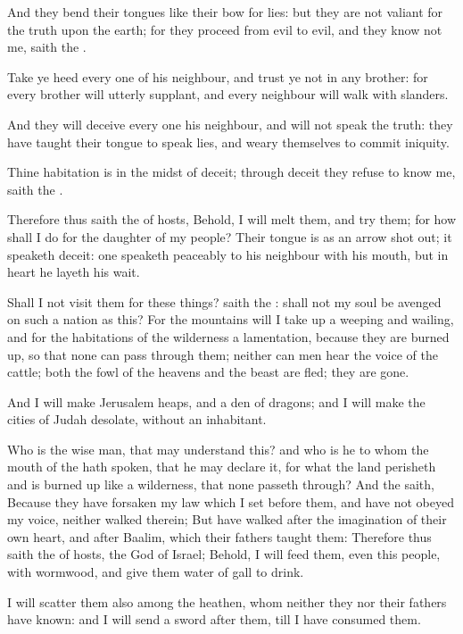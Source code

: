 \verse And they bend their tongues like their bow for lies: but they are not valiant for the truth upon the earth; for they proceed from evil to evil, and they know not me, saith the \LORD.

\verse Take ye heed every one of his neighbour, and trust ye not in any brother: for every brother will utterly supplant, and every neighbour will walk with slanders.

\verse And they will deceive every one his neighbour, and will not speak the truth: they have taught their tongue to speak lies, and weary themselves to commit iniquity.

\verse Thine habitation is in the midst of deceit; through deceit they refuse to know me, saith the \LORD.

\verse Therefore thus saith the \LORD of hosts, Behold, I will melt them, and try them; for how shall I do for the daughter of my people?  \verse Their tongue is as an arrow shot out; it speaketh deceit: one speaketh peaceably to his neighbour with his mouth, but in heart he layeth his wait.

\verse Shall I not visit them for these things? saith the \LORD: shall not my soul be avenged on such a nation as this?  \verse For the mountains will I take up a weeping and wailing, and for the habitations of the wilderness a lamentation, because they are burned up, so that none can pass through them; neither can men hear the voice of the cattle; both the fowl of the heavens and the beast are fled; they are gone.

\verse And I will make Jerusalem heaps, and a den of dragons; and I will make the cities of Judah desolate, without an inhabitant.

\verse Who is the wise man, that may understand this? and who is he to whom the mouth of the \LORD hath spoken, that he may declare it, for what the land perisheth and is burned up like a wilderness, that none passeth through?  \verse And the \LORD saith, Because they have forsaken my law which I set before them, and have not obeyed my voice, neither walked therein; \verse But have walked after the imagination of their own heart, and after Baalim, which their fathers taught them: \verse Therefore thus saith the \LORD of hosts, the God of Israel; Behold, I will feed them, even this people, with wormwood, and give them water of gall to drink.

\verse I will scatter them also among the heathen, whom neither they nor their fathers have known: and I will send a sword after them, till I have consumed them.

